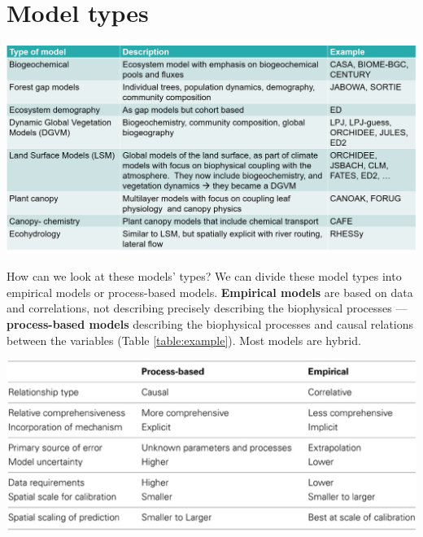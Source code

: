 \documentclass[12pt,oneside]{book}
\begin{document}
\pagebreak

\section{Model types}\label{model-types}

\begin{center}
\label{table:example}

\begin{center}\includegraphics[width=0.8\linewidth]{figures/chap1/table_model_types} \end{center}
\end{center}

How can we look at these models' types? We can divide these model types
into empirical models or process-based models. \textbf{Empirical models}
are based on data and correlations, not describing precisely describing
the biophysical processes --- \textbf{process-based models} describing
the biophysical processes and causal relations between the variables
(Table \ref{table:example}). Most models are hybrid.

\begin{center}
\label{table:empricial}

\begin{center}\includegraphics[width=0.8\linewidth]{figures/chap1/tables_PB_empirical} \end{center}
\end{center}
\end{document}
